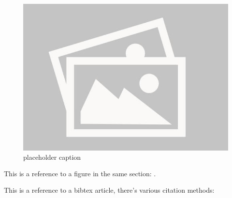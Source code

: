 \documentclass[../main.tex]{subfiles}
\begin{document}
\lipsum[1]

\begin{figure}[!ht] \label{fig:placeholder}  
    \centering
    \includegraphics{images/placeholder.jpg}
    \caption{placeholder caption}
\end{figure}

\lipsum[2]

This is a reference to a figure in the same section: .

This is a reference to a bibtex article, there's various citation methods: 

\noindent
\cite{texbook} 

\noindent
\citeauthor{texbook} 

\noindent
\textcite{texbook}

\noindent
{}
\end{document}
